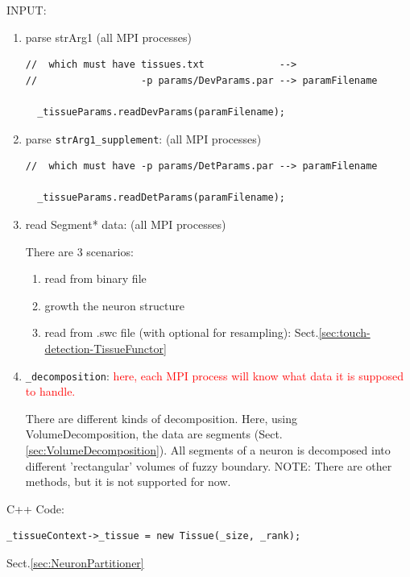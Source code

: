 INPUT:
\begin{enumerate}
  \item parse strArg1 (all MPI processes)
  
\begin{verbatim}
//  which must have tissues.txt             -->
//                  -p params/DevParams.par --> paramFilename

  _tissueParams.readDevParams(paramFilename);
\end{verbatim}

  \item parse \verb!strArg1_supplement!: (all MPI processes)

\begin{verbatim}
//  which must have -p params/DetParams.par --> paramFilename
  
  _tissueParams.readDetParams(paramFilename);
\end{verbatim}
  
  \item read Segment* data: (all MPI processes)

 There are 3 scenarios:
  \begin{enumerate}
    \item read from binary file
    
    \item growth the neuron structure 
    
    \item read from .swc file (with optional for resampling):
    Sect.\ref{sec:touch-detection-TissueFunctor} 
    
  \end{enumerate}
  
  \item \verb!_decomposition!: \textcolor{red}{here, each MPI process
  will know what data it is supposed to handle.}
  
  There are different kinds of decomposition. Here, using VolumeDecomposition,
  the data are segments (Sect.\ref{sec:VolumeDecomposition}). All segments of a
  neuron is decomposed into different 'rectangular' volumes of fuzzy boundary.
  NOTE: There are other methods, but it is not supported for now.
  
 
\end{enumerate}

C++ Code:
\begin{verbatim}
_tissueContext->_tissue = new Tissue(_size, _rank);
\end{verbatim}
Sect.\ref{sec:NeuronPartitioner}
  
